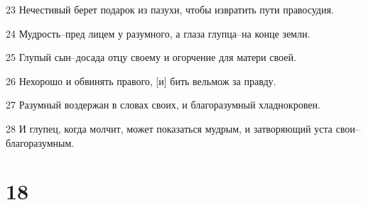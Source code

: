 \par 23 Нечестивый берет подарок из пазухи, чтобы извратить пути правосудия.
\par 24 Мудрость--пред лицем у разумного, а глаза глупца--на конце земли.
\par 25 Глупый сын--досада отцу своему и огорчение для матери своей.
\par 26 Нехорошо и обвинять правого, [и] бить вельмож за правду.
\par 27 Разумный воздержан в словах своих, и благоразумный хладнокровен.
\par 28 И глупец, когда молчит, может показаться мудрым, и затворяющий уста свои--благоразумным.

\chapter{18}

